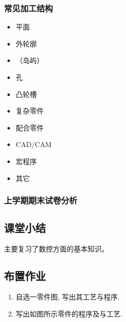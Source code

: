 \subsubsection{常见加工结构}
\begin{itemize}
	\item 平面

	\item 外轮廓

	\item （岛屿）

	\item 孔
	\item 凸轮槽

	\item 复杂零件

	\item 配合零件

	\item CAD/CAM

	\item 宏程序

	\item 其它
\end{itemize}
\subsubsection{上学期期末试卷分析}
\subsection{课堂小结}
主要复习了数控方面的基本知识。
\vfill
\subsection{布置作业}
\begin{enumerate}[1、]
	\item 自选一零件图, 写出其工艺与程序.

	\item 写出如图所示零件的程序及与工艺.
\end{enumerate}